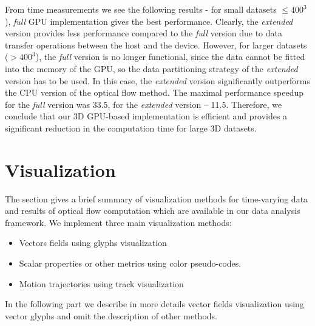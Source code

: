 From time measurements we see the following results - for small datasets $\le 400^3$), \textit{full} GPU implementation gives the best performance. Clearly, the \textit{extended} version provides less performance compared to the \textit{full} version due to data transfer operations between the host and the device. However, for larger datasets ($> 400^3$), the \textit{full} version is no longer functional, since the data cannot be fitted into the memory of the GPU, so the data partitioning strategy of the \textit{extended} version has to be used. In this case, the \textit{extended} version significantly outperforms the CPU version of the optical flow method. The maximal performance speedup for the \textit{full} version was 33.5, for the \textit{extended} version -- 11.5. Therefore, we conclude that our 3D GPU-based implementation is efficient and provides a significant reduction in the computation time for large 3D datasets.




\section {Visualization}
\label{visualization}

The section gives a brief summary of visualization methods for time-varying data and results of optical flow computation which are available in our data analysis framework. We implement three main visualization methods:
\begin{itemize}
	\item Vectors fields using glyphs visualization 
	
	\item Scalar properties or other metrics using color pseudo-codes.
	
	\item Motion trajectories using track visualization 
\end{itemize} 

In the following part we describe in more details vector fields visualization using vector glyphs and omit the description of other methods. 

%


